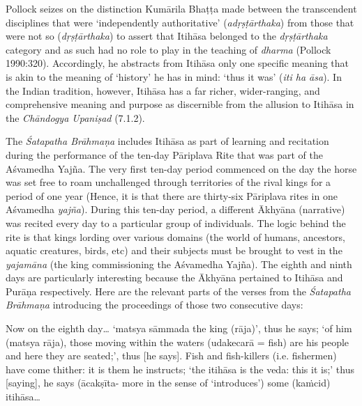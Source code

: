 Pollock seizes on the distinction Kumārila Bhaṭṭa made between the transcendent disciplines that were ‘independently authoritative’ (\textit{adṛṣṭārthaka}) from those that were not so (\textit{dṛṣṭārthaka}) to assert that Itihāsa belonged to the \textit{dṛṣṭārthaka} category and as such had no role to play in the teaching of \textit{dharma} (Pollock 1990:320). Accordingly, he abstracts from Itihāsa only one specific meaning that is akin to the meaning of ‘history’ he has in mind: ‘thus it was’ (\textit{iti ha āsa}). In the Indian tradition, however, Itihāsa has a far richer, wider-ranging, and comprehensive meaning and purpose as discernible from the allusion to Itihāsa in the \textit{Chāndogya Upaniṣad} (7.1.2). 

The \textit{Śatapatha Brāhmaṇa} includes Itihāsa as part of learning and recitation during the performance of the ten-day Pāriplava Rite that was part of the Aśvamedha Yajña. The very first ten-day period commenced on the day the horse was set free to roam unchallenged through territories of the rival kings for a period of one year (Hence, it is that there are thirty-six Pāriplava rites in one Aśvamedha \textit{yajña}). During this ten-day period, a different Ākhyāna (narrative) was recited every day to a particular group of individuals. The logic behind the rite is that kings lording over various domains (the world of humans, ancestors, aquatic creatures, birds, etc) and their subjects must be brought to vest in the \textit{yajamāna} (the king commissioning the Aśvamedha Yajña). The eighth and ninth days are particularly interesting because the Ākhyāna pertained to Itihāsa and Purāṇa respectively. Here are the relevant parts of the verses from the \textit{Śatapatha Brāhmaṇa}  introducing the proceedings of those two consecutive days:

\begin{myquote}
Now on the eighth day… ‘matsya sāmmada the king (rāja)’, thus he says; ‘of him (matsya rāja), those moving within the waters (udakecarā = fish) are his people and here they are seated;’, thus [he says]. Fish and fish-killers (i.e. fishermen) have come thither: it is them he instructs; ‘the itihāsa is the veda: this it is;’ thus [saying], he says (ācakṣīta- more in the sense of ‘introduces’) some (kaṁcid) itihāsa…
\end{myquote}

